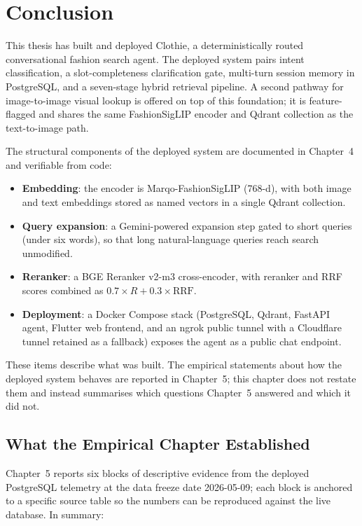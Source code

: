 
\section{Conclusion}
This thesis has built and deployed Clothie, a deterministically routed conversational fashion search agent. The deployed system pairs intent classification, a slot-completeness clarification gate, multi-turn session memory in PostgreSQL, and a seven-stage hybrid retrieval pipeline. A second pathway for image-to-image visual lookup is offered on top of this foundation; it is feature-flagged and shares the same FashionSigLIP encoder and Qdrant collection as the text-to-image path.

The structural components of the deployed system are documented in Chapter~4 and verifiable from code:

\begin{itemize}
    \item \textbf{Embedding}: the encoder is Marqo-FashionSigLIP (768-d), with both image and text embeddings stored as named vectors in a single Qdrant collection.
    \item \textbf{Query expansion}: a Gemini-powered expansion step gated to short queries (under six words), so that long natural-language queries reach search unmodified.
    \item \textbf{Reranker}: a BGE Reranker v2-m3 cross-encoder, with reranker and RRF scores combined as $0.7\times R + 0.3\times \text{RRF}$.
    \item \textbf{Deployment}: a Docker Compose stack (PostgreSQL, Qdrant, FastAPI agent, Flutter web frontend, and an ngrok public tunnel with a Cloudflare tunnel retained as a fallback) exposes the agent as a public chat endpoint.
\end{itemize}

These items describe what was built. The empirical statements about how the deployed system behaves are reported in Chapter~5; this chapter does not restate them and instead summarises which questions Chapter~5 answered and which it did not.

\subsection{What the Empirical Chapter Established}
\label{subsec:empirical_summary}

Chapter~5 reports six blocks of descriptive evidence from the deployed PostgreSQL telemetry at the data freeze date 2026-05-09; each block is anchored to a specific source table so the numbers can be reproduced against the live database. In summary:

